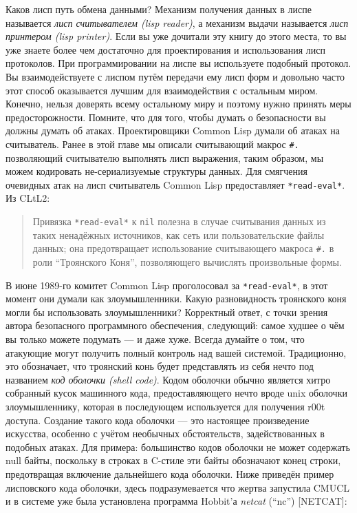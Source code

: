 Каков лисп путь обмена данными? Механизм получения данных в лиспе называется \emph{лисп считывателем (lisp reader)}, а механизм выдачи называется \emph{лисп принтером (lisp printer)}. Если вы уже дочитали эту книгу до этого места, то вы уже знаете более чем достаточно для проектирования и использования лисп протоколов. При программировании на лиспе вы используете подобный протокол. Вы взаимодействуете с лиспом путём передачи ему лисп форм и довольно часто этот способ оказывается лучшим для взаимодействия с остальным миром. Конечно, нельзя доверять всему остальному миру и поэтому нужно принять меры предосторожности. Помните, что для того, чтобы думать о безопасности вы должны думать об атаках. Проектировщики Common Lisp думали об атаках на считыватель. Ранее в этой главе мы описали считывающий макрос \verb"#." позволяющий считывателю выполнять лисп выражения, таким образом, мы можем кодировать не-сериализуемые структуры данных. Для смягчения очевидных атак на лисп считыватель Common Lisp предоставляет \verb"*read-eval*". Из CLtL2:

\begin{quote}
Привязка \verb"*read-eval*" к \verb"nil" полезна в случае считывания данных из таких ненадёжных источников, как сеть или пользовательские файлы данных; она предотвращает использование считывающего макроса \verb"#." в роли ``Троянского Коня'', позволяющего вычислять произвольные формы.
\end{quote}

В июне 1989-го комитет Common Lisp проголосовал за \verb"*read-eval*", в этот момент они думали как злоумышленники. Какую разновидность троянского коня могли бы использовать злоумышленники? Корректный ответ, с точки зрения автора безопасного программного обеспечения, следующий: самое худшее о чём вы только можете подумать --- и даже хуже. Всегда думайте о том, что атакующие могут получить полный контроль над вашей системой. Традиционно, это обозначает, что троянский конь будет представлять из себя нечто под названием \emph{код оболочки (shell code)}. Кодом оболочки обычно является хитро собранный кусок машинного кода, предоставляющего нечто вроде unix оболочки злоумышленнику, которая в последующем используется для получения r00t доступа. Создание такого кода оболочки --- это настоящее произведение искусства, особенно с учётом необычных обстоятельств, задействованных в подобных атаках. Для примера: большинство кодов оболочки не может содержать null байты, поскольку в строках в C-стиле эти байты обозначают конец строки, предотвращая включение дальнейшего кода оболочки. Ниже приведён пример лисповского кода оболочки, здесь подразумевается что жертва запустила CMUCL и в системе уже была установлена программа Hobbit'а \emph{netcat} (``nc'') [NETCAT]:

